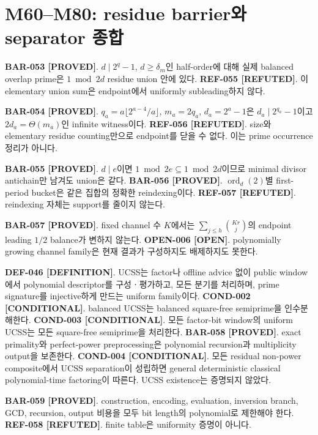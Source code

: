 \documentclass[11pt]{article}
\newcommand{\claimstatus}[2]{\textbf{#1 [#2]}}
\begin{document}
\section{M60--M80: residue barrier와 separator 종합}

\claimstatus{BAR-053}{PROVED}.
\(d\mid2^q-1\), \(d\ge\delta_m\)인 half-order에 대해 실제 balanced
overlap prime은 \(1\bmod2d\) residue union 안에 있다.
\claimstatus{REF-055}{REFUTED}. 이 elementary union sum은 endpoint에서
uniformly subleading하지 않다.

\claimstatus{BAR-054}{PROVED}.
\(q_a=a\lfloor2^{a-4}/a\rfloor\), \(m_a=2q_a\),
\(d_a=2^a-1\)은 \(d_a\mid2^{q_a}-1\)이고
\(2d_a=\Theta(m_a)\)인 infinite witness이다.
\claimstatus{REF-056}{REFUTED}. size와 elementary residue counting만으로
endpoint를 닫을 수 없다. 이는 prime occurrence 정리가 아니다.

\claimstatus{BAR-055}{PROVED}. \(d\mid e\)이면
\(1\bmod2e\subseteq1\bmod2d\)이므로 minimal divisor antichain만 남겨도
union은 같다.
\claimstatus{BAR-056}{PROVED}. \(\operatorname{ord}_d(2)\)별 first-period
bucket은 같은 집합의 정확한 reindexing이다.
\claimstatus{REF-057}{REFUTED}. reindexing 자체는 support를 줄이지 않는다.

\claimstatus{BAR-057}{PROVED}. fixed channel 수 \(K\)에서는
\(\sum_{j\le h}\binom{Kr}{j}\)의 endpoint leading \(1/2\) balance가
변하지 않는다.
\claimstatus{OPEN-006}{OPEN}. polynomially growing channel family은 현재
결과가 구성하지도 배제하지도 못한다.

\claimstatus{DEF-046}{DEFINITION}. UCSS는 factor나 offline advice 없이
public window에서 polynomial descriptor를 구성ㆍ평가하고, 모든 분기를
처리하며, prime signature를 injective하게 만드는 uniform family이다.
\claimstatus{COND-002}{CONDITIONAL}. balanced UCSS는 balanced square-free
semiprime을 인수분해한다.
\claimstatus{COND-003}{CONDITIONAL}. 모든 factor-bit window의 uniform
UCSS는 모든 square-free semiprime을 처리한다.
\claimstatus{BAR-058}{PROVED}. exact primality와 perfect-power preprocessing은
polynomial recursion과 multiplicity output을 보존한다.
\claimstatus{COND-004}{CONDITIONAL}. 모든 residual non-power composite에서
UCSS separation이 성립하면 general deterministic classical
polynomial-time factoring이 따른다. UCSS existence는 증명되지 않았다.

\claimstatus{BAR-059}{PROVED}. construction, encoding, evaluation,
inversion branch, GCD, recursion, output 비용을 모두 bit length의
polynomial로 제한해야 한다.
\claimstatus{REF-058}{REFUTED}. finite table은 uniformity 증명이 아니다.
\end{document}
